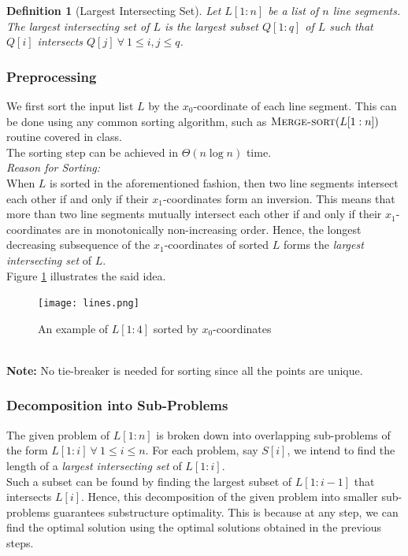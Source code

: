 \documentclass[12pt]{report}
\newtheorem{definition}{Definition}
\begin{document}
    \begin{definition}[Largest Intersecting Set]
        \label{def:lis}
        Let $L[1:n]$ be a list of $n$ line segments.
        The largest intersecting set of $L$ is the largest subset $Q[1:q]$ of $L$ such that $Q[i]$ intersects $Q[j] \ \forall \ 1 \le i, j \le q$.
    \end{definition}

    \subsubsection*{Preprocessing}
    We first sort the input list $L$ by the $x_{0}$-coordinate of each line segment.
    This can be done using any common sorting algorithm, such as $\Call{Merge-sort}{L[1:n]}$ routine covered in class. \\
    The sorting step can be achieved in $\Theta(n \log{n})$ time. \\
    \textit{Reason for Sorting:}
    \vspace*{2.5pt} \\
    When $L$ is sorted in the aforementioned fashion, then two line segments intersect each other if and only if their $x_{1}$-coordinates form an inversion.
    This means that more than two line segments mutually intersect each other if and only if their $x_{1}$-coordinates are in monotonically non-increasing order.
    Hence, the longest decreasing subsequence of the $x_{1}$-coordinates of sorted $L$ forms the \textit{largest intersecting set} of $L$.
    \vspace*{10pt} \\
    Figure \ref{fig:lines} illustrates the said idea.
    \begin{figure}[htp]
        \begin{center}
            \texttt{[image: lines.png]}
        \end{center}
        \caption{An example of $L[1:4]$ sorted by $x_{0}$-coordinates}
        \label{fig:lines}
    \end{figure}
    \vspace*{5pt} \\
    \textbf{Note:} No tie-breaker is needed for sorting since all the points are unique.

    \subsubsection*{Decomposition into Sub-Problems}
    The given problem of $L[1:n]$ is broken down into overlapping sub-problems of the form $L[1:i] \ \forall \ 1 \le i \le n$.
    For each problem, say $S[i]$, we intend to find the length of a \textit{largest intersecting set} of $L[1:i]$. \\
    Such a subset can be found by finding the largest subset of $L[1:i-1]$ that intersects $L[i]$.
    Hence, this decomposition of the given problem into smaller sub-problems guarantees substructure optimality.
    This is because at any step, we can find the optimal solution using the optimal solutions obtained in the previous steps.
\end{document}
